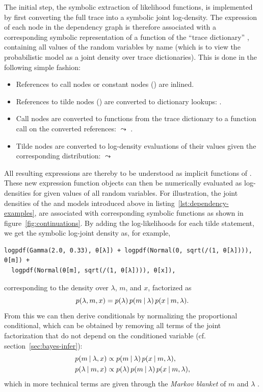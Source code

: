 The initial step, the symbolic extraction of likelihood functions, is implemented by first
converting the full trace into a symbolic joint log-density.  The expression of each node in the
dependency graph is therefore associated with a corresponding symbolic representation of a function
of the \enquote{trace dictionary} , containing all values of the random variables by name
(which is to view the probabilistic model as a joint density over trace dictionaries).  This is done
in the following simple fashion:
\begin{itemize}
  \firmlist
\item References to call nodes or constant nodes () are inlined.
\item References to tilde nodes () are converted to dictionary lookups: .
\item Call nodes are converted to functions from the trace dictionary to a
  function call on the converted references:  \(\leadsto\) .
\item Tilde nodes are converted to log-density evaluations of their values given the corresponding
  distribution:  \(\leadsto\) 
\end{itemize}
All resulting expressions are thereby to be understood as implicit functions of .  These
new expression function objects can then be numerically evaluated as log-densities for given values
of all random variables.  For illustration, the joint densities of the  and
 models introduced above in listing~\ref{lst:dependency-examples}, are
associated with corresponding symbolic functions as shown in figure~\ref{fig:continuations}.  By
adding the log-likelihoods for each tilde statement, we get the symbolic log-joint density as, for
example,
\enlargethispage{\baselineskip}
\begin{lstlisting}
logpdf(Gamma(2.0, 0.33), θ[λ]) + logpdf(Normal(0, sqrt(/(1, θ[λ]))), θ[m]) + 
  logpdf(Normal(θ[m], sqrt(/(1, θ[λ]))), θ[x]),
\end{lstlisting}
corresponding to the density over \(\lambda\), \(m\), and \(x\), factorized as
\begin{equation}
  p(\lambda, m, x) = p(\lambda) \, p(m \:\vert\: \lambda) \, p(x \:\vert\: m, \lambda).
\end{equation}
From this we can then derive conditionals by normalizing the proportional conditional, which can be
obtained by removing all terms of the joint factorization that do not depend on the conditioned
variable (cf. section~\ref{sec:bayes-infer}):
\begin{equation}
  \begin{aligned}
    p(m \:\vert\: \lambda, x) &\propto p(m \:\vert\: \lambda) \, p(x \:\vert\: m, \lambda), \\
    p(\lambda \:\vert\: m, x) &\propto p(\lambda) \, p(m \:\vert\: \lambda) \, p(x \:\vert\: m, \lambda),
  \end{aligned}
\end{equation}
which in more technical terms are given through the \emph{Markov blanket} of \(m\) and \(\lambda\)
\parencites[section 24.2]{murphy2012machine}[section 4.5]{koller2009probabilistic}.

